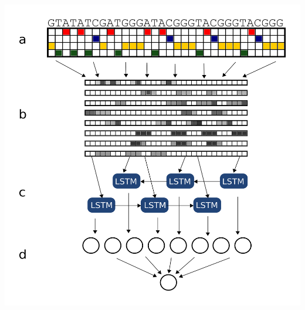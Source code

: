 \documentclass[12pt,a4paper,]{report}
\let\origfigure=\figure
\let\endorigfigure=\endfigure
\renewenvironment{figure}[1][2] {
    \expandafter\origfigure\expandafter[H]
} {
    \endorigfigure
}
\begin{document}
\begin{figure}[htbp]
\centering
\includegraphics[width=\textwidth,height=562pt,keepaspectratio]{chapter_3/figures/architecture.png}
\caption[G4Seeqer architecture]{\textbf{G4Seeqer   architecture}   Adapted   from   Quang   \&   Xie   2016.   \textbf{a)}   Sequences   are   one   hot   encoded   to   produce   a   matrix   which   can   be   processed   by   the   neural   network.   \textbf{b)}   Input   matrices   are   passed   through   a   convolutional   layer.   Each   layer   contains   8   filters   which   are   trained   to   recognise   local   patterns   on   the   scale   of   3-6bp   in   size.   \textbf{c)}   Convolutional   features   are   passed   through   a   bidirectional   Long   Short   Term   Memory   (LSTM)   layer.   This   layer   recognises   long   distance   interactions   between   features   which   might   combine   to   produce   G4s.   \textbf{d)}   Finally,   features   are   passed   through   a   fully   connected   layer.   Output   from   the   model   is   a   single   probability   of   whether   the   sequence   forms   a   G4.   \label{architecture}}
\end{figure}
\end{document}
